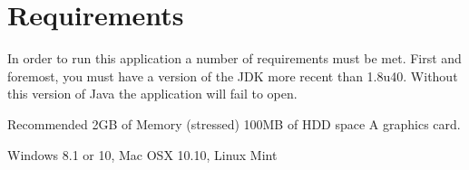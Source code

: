 \section{Requirements}

In order to run this application a number of requirements must be met. First and foremost, you must have a version of the JDK more recent than 1.8u40. Without this version of Java the application will fail to open.

Recommended
2GB of Memory (stressed)
100MB of HDD space
A graphics card.

Windows 8.1 or 10, Mac OSX 10.10, Linux Mint
